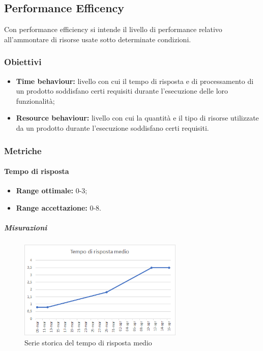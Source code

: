 	\subsection{Performance Efficency}
		Con performance efficiency si intende il livello di performance relativo all'ammontare di risorse usate sotto determinate condizioni. 
		\subsubsection{Obiettivi}
			\begin{itemize}
				\item {\textbf{Time behaviour:} livello con cui il tempo di risposta e di processamento di un prodotto soddisfano certi requisiti durante l'esecuzione delle loro funzionalità;}
				\item {\textbf{Resource behaviour:} livello con cui la quantità e il tipo di risorse utilizzate da un prodotto durante l'esecuzione soddisfano certi requisiti.}
			\end{itemize}
		\subsubsection{Metriche}
			\paragraph{Tempo di risposta} \Spazio
			\begin{itemize}
				\item {\textbf{Range ottimale:} 0-3;}
				\item {\textbf{Range accettazione:} 0-8.}
			\end{itemize} 
		     \subparagraph{Misurazioni}
		      \begin{figure}[H]
		      \centering 
		      \includegraphics[width=0.7\textwidth]{images/risposta.png}
		    	\caption{Serie storica del tempo di risposta medio}
		    	\label{risposta} 
		    \end{figure}
			
